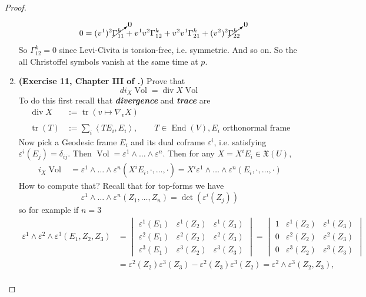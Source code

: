 \begin{proof}
\begin{enumerate}[label=\textbf{Step \arabic*}]
\begin{align*}
	0=(v^1)^2 \cancelto{0}{\Gamma_{1 1}^k}+v^1v^2 \Gamma_{1 2}^k+v^2v^1\Gamma_{2 1}^k+(v^2)^2\cancelto{0}{\Gamma_{2 2}^k}
\end{align*}
So \(\Gamma_{12}^k=0\) since Levi-Civita is torsion-free, i.e. symmetric. And so on. So the all Christoffel symbols vanish at the same time at \(p\).
\item \textbf{(Exercise 11, Chapter III of  \cite{doc}.)} Prove that \[di_X \operatorname{Vol}=\operatorname{div}X \operatorname{Vol}\]
	To do this first recall that \textit{\textbf{divergence}} and \textit{\textbf{trace}} are
	\begin{align*}\operatorname{div}X&:=\operatorname{tr}(v \mapsto \nabla_vX)\\ \\
		\operatorname{tr}(T)&:=\sum_i\left<TE_i,E_i\right>, \qquad T\in \operatorname{End}(V), E_i\text{ orthonormal frame} \end{align*}
	Now pick a Geodesic frame \(E_i\) and its dual coframe \(\varepsilon^i\), i.e. satisfying \(\varepsilon^i(E_j)=\delta_{ij}\). Then \(\operatorname{Vol}=\varepsilon^1 \wedge \ldots \wedge \varepsilon^n\). Then for any \(X=X^iE_i \in \mathfrak{X}(U)\),
	\begin{align*}
	i_X\operatorname{Vol}&=\varepsilon^1\wedge\ldots\wedge\varepsilon^n(X^iE_i,\cdot,\ldots,\cdot)=X^i\varepsilon^1\wedge\ldots\wedge\varepsilon^n(E_i,\cdot,\ldots,\cdot)
	\end{align*}
	How to compute that? Recall that for top-forms we have
	\[\varepsilon^1\wedge\ldots\wedge\varepsilon^n(Z_1,\ldots,Z_n)=\det(\varepsilon^i(Z_j))\]
	so for example if \(n=3\)
	\begin{align*}\varepsilon^1\wedge \varepsilon^2\wedge\varepsilon^3(E_1,Z_2,Z_3)&=\begin{vmatrix} \varepsilon^1(E_1)&\varepsilon^1(Z_2) &\varepsilon^1(Z_3)\\
\varepsilon^2(E_1)&\varepsilon^2(Z_2)&\varepsilon^2(Z_3)\\
\varepsilon^3(E_1)&\varepsilon^3(Z_2)&\varepsilon^3(Z_3)
	\end{vmatrix}=\begin{vmatrix} 1&\varepsilon^1(Z_2) &\varepsilon^1(Z_3)\\
0&\varepsilon^2(Z_2)&\varepsilon^2(Z_3)\\
0&\varepsilon^3(Z_2)&\varepsilon^3(Z_3)
	\end{vmatrix}\\
	&=\varepsilon^2(Z_2)\varepsilon^3(Z_3)-\varepsilon^2(Z_3)\varepsilon^3(Z_2)=\varepsilon^2\wedge\varepsilon^3(Z_2,Z_3),\\

\end{align*}
\end{enumerate}
\end{proof}
